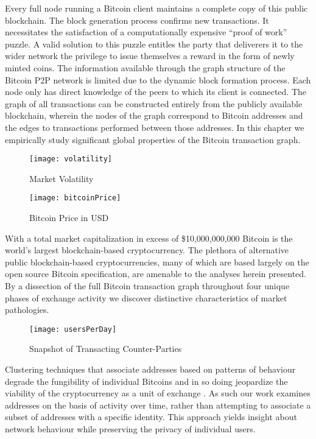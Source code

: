 Every full node running a Bitcoin client maintains a complete copy of this public blockchain. 
The block generation process confirms new transactions. It necessitates the satisfaction of a computationally expensive ``proof of work'' puzzle. A valid solution to this puzzle entitles the party that deliverers it to the wider network the privilege to issue themselves a reward in the form of newly minted coins. 
The information available through the graph structure of the Bitcoin P2P network is limited due to the dynamic block formation process. 
Each node only has direct knowledge of the peers to which its client is connected. 
The graph of all transactions can be constructed entirely from the publicly available blockchain, wherein the nodes of the graph correspond to Bitcoin addresses and the edges to transactions performed between those addresses. 
In this chapter we empirically study significant global properties of the Bitcoin transaction graph. 

\begin{figure}
\centering
        \texttt{[image: volatility]}
        \caption{Market Volatility}
        \label{fig:PERIODIC}
\end{figure}

\begin{figure}
\centering
        \texttt{[image: bitcoinPrice]}
        \caption{Bitcoin Price in USD}
        \label{fig:RQL}
\end{figure}
 
With a total market capitalization in excess of \$10,000,000,000 \cite{billy} Bitcoin is the world's largest blockchain-based cryptocurrency. 
The plethora of alternative public blockchain-based cryptocurrencies, many of which are based largely on the open source Bitcoin specification, are amenable to the analyses herein presented.
By a dissection of the full Bitcoin transaction graph throughout four unique phases of exchange activity we discover distinctive characteristics of market pathologies. 

\begin{figure}
\centering
        \texttt{[image: usersPerDay]}
        \caption{Snapshot of Transacting Counter-Parties}
        \label{fig:OU}
\end{figure}

Clustering techniques that associate addresses based on patterns of behaviour degrade the fungibility of individual Bitcoins and in so doing jeopardize the viability of the cryptocurrency as a unit of exchange \cite{moser2014towards}.
As such our work examines addresses on the basis of activity over time, rather than attempting to associate a subset of addresses with a specific identity.
This approach yields insight about network behaviour while preserving the privacy of individual users.

